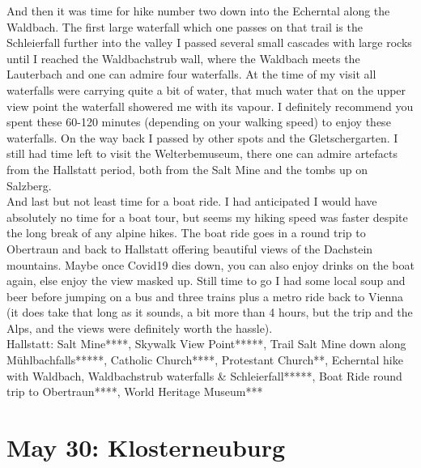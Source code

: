   And then it was time for hike number two down into the Echerntal along the Waldbach. The first large waterfall which one passes on that trail is the Schleierfall further into the valley I passed several small cascades with large rocks until I reached the Waldbachstrub wall, where the Waldbach meets the Lauterbach and one can admire four waterfalls. At the time of my visit all waterfalls were carrying quite a bit of water, that much water that on the upper view point the waterfall showered me with its vapour. I definitely recommend you spent these 60-120 minutes (depending on your walking speed) to enjoy these waterfalls. On the way back I passed by other spots and the Gletschergarten. I still had time left to visit the Welterbemuseum, there one can admire artefacts from the Hallstatt period, both from the Salt Mine and the tombs up on Salzberg.\\
   And last but not least time for a boat ride. I had anticipated I would have absolutely no time for a boat tour, but seems my hiking speed was faster despite the long break of any alpine hikes. The boat ride goes in a round trip to Obertraun and back to Hallstatt offering beautiful views of the Dachstein mountains. Maybe once Covid19 dies down, you can also enjoy drinks on the boat again, else enjoy the view masked up. Still time to go I had some local soup and beer before jumping on a bus and three trains plus a metro ride back to Vienna (it does take that long as it sounds, a bit more than 4 hours, but the trip and the Alps, and the views were definitely worth the hassle).\\

Hallstatt: Salt Mine****, Skywalk View Point*****, Trail Salt Mine down along M\"uhlbachfalls*****, Catholic Church****, Protestant Church**, Echerntal hike with Waldbach, Waldbachstrub waterfalls \& Schleierfall*****, Boat Ride round trip to Obertraun****, World Heritage Museum***

\section{May 30: Klosterneuburg}
\label{Klosterneuburg}

